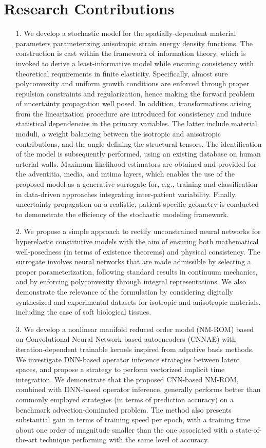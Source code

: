 \section{Research Contributions}

\begin{itemize}
    \item[1.] We develop a stochastic model for the spatially-dependent material parameters parameterizing anisotropic strain energy density functions. The construction is cast within the framework of information theory, which is invoked to derive a least-informative model while ensuring consistency with theoretical requirements in finite elasticity. Specifically, almost sure polyconvexity and uniform growth conditions are enforced through proper repulsion constraints and regularization, hence making the forward problem of uncertainty propagation well posed. In addition, transformations arising from the linearization procedure are introduced for consistency and induce statistical dependencies in the primary variables. The latter include material moduli, a weight balancing between the isotropic and anisotropic contributions, and the angle defining the structural tensors. The identification of the model is subsequently performed, using an existing database on human arterial walls. Maximum likelihood estimators are obtained and provided for the adventitia, media, and intima layers, which enables the use of the proposed model as a generative surrogate for, e.g., training and classification in data-driven approaches integrating inter-patient variability. Finally, uncertainty propagation on a realistic, patient-specific geometry is conducted to demonstrate the efficiency of the stochastic modeling framework.
    \item[2.] We propose a simple approach to rectify unconstrained neural networks for hyperelastic constitutive models with the aim of ensuring both mathematical well-posedness (in terms of existence theorems) and physical consistency. The surrogate involves neural networks that are made admissible by selecting a proper parameterization, following standard results in continuum mechanics, and by enforcing polyconvexity through integral representations. We also demonstrate the relevance of the formulation by considering digitally synthesized and experimental datasets for isotropic and anisotropic materials, including the case of soft biological tissues.
    \item[3.] We develop a nonlinear manifold reduced order model (NM-ROM) based on Convolutional Neural Network-based autoencoders (CNNAE) with iteration-dependent trainable kernels inspired from adpative basis methods. We investigate DNN-based operator inference strategies between latent spaces, and propose a strategy to perform vectorized implicit time integration. We demonstrate that the proposed CNN-based NM-ROM, combined with DNN-based operator inference, generally performs better than commonly employed strategies (in terms of prediction accuracy) on a benchmark advection-dominated problem. The method also presents substantial gain in terms of training speed per epoch, with a training time about one order of magnitude smaller than the one associated with a state-of-the-art technique performing with the same level of accuracy.

\end{itemize}
